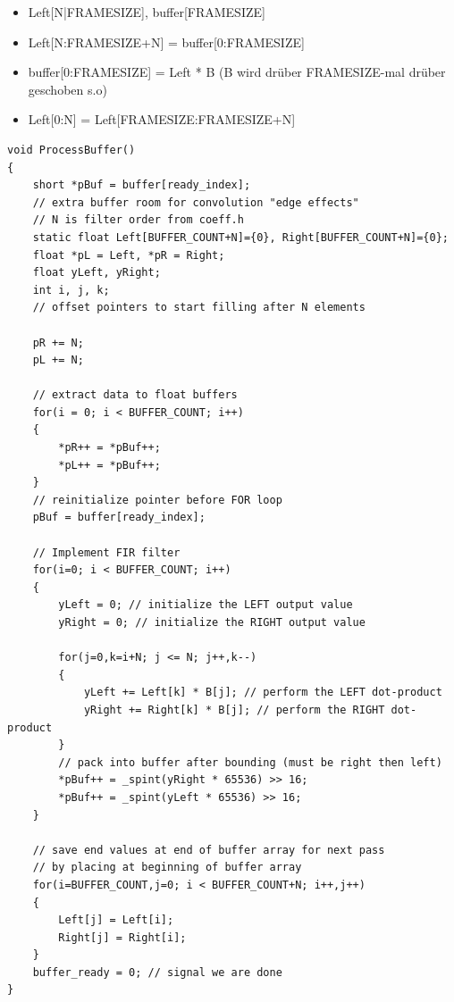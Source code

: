 \documentclass[10pt,a4paper]{article}
\begin{document}
\begin{itemize}
    \item Left[N|FRAMESIZE], buffer[FRAMESIZE]
    \item Left[N:FRAMESIZE+N] = buffer[0:FRAMESIZE]
    \item buffer[0:FRAMESIZE] = Left * B (B wird drüber FRAMESIZE-mal drüber geschoben s.o)
    \item Left[0:N] = Left[FRAMESIZE:FRAMESIZE+N]
\end{itemize}
\begin{verbatim}
void ProcessBuffer()
{
    short *pBuf = buffer[ready_index];
    // extra buffer room for convolution "edge effects"
    // N is filter order from coeff.h
    static float Left[BUFFER_COUNT+N]={0}, Right[BUFFER_COUNT+N]={0};
    float *pL = Left, *pR = Right;
    float yLeft, yRight;
    int i, j, k;
    // offset pointers to start filling after N elements

    pR += N;
    pL += N;

    // extract data to float buffers
    for(i = 0; i < BUFFER_COUNT; i++) 
    { 
        *pR++ = *pBuf++;
        *pL++ = *pBuf++;
    }
    // reinitialize pointer before FOR loop
    pBuf = buffer[ready_index];

    // Implement FIR filter
    for(i=0; i < BUFFER_COUNT; i++) 
    {
        yLeft = 0; // initialize the LEFT output value
        yRight = 0; // initialize the RIGHT output value

        for(j=0,k=i+N; j <= N; j++,k--) 
        {
            yLeft += Left[k] * B[j]; // perform the LEFT dot-product
            yRight += Right[k] * B[j]; // perform the RIGHT dot-product
        }
        // pack into buffer after bounding (must be right then left)
        *pBuf++ = _spint(yRight * 65536) >> 16;
        *pBuf++ = _spint(yLeft * 65536) >> 16;
    }

    // save end values at end of buffer array for next pass
    // by placing at beginning of buffer array
    for(i=BUFFER_COUNT,j=0; i < BUFFER_COUNT+N; i++,j++) 
    {
        Left[j] = Left[i];
        Right[j] = Right[i];
    }
    buffer_ready = 0; // signal we are done
}
\end{verbatim}

\end{document}
